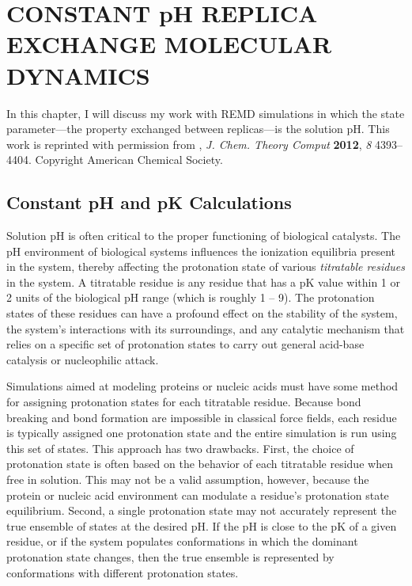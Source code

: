 \chapter{CONSTANT pH REPLICA EXCHANGE MOLECULAR DYNAMICS}
\label{ch3}

In this chapter, I will discuss my work with REMD simulations in which the state
parameter---the property exchanged between replicas---is the solution pH.  This
work is reprinted with permission from
\citeauthor*{Swails_JChemTheoryComput_2012_v8_p4393}, \emph{J. Chem. Theory
Comput} \textbf{2012}, \emph{8} 4393--4404. Copyright
\citeyear{Swails_JChemTheoryComput_2012_v8_p4393} American Chemical Society.
\cite{Swails_JChemTheoryComput_2012_v8_p4393}

\section{Constant pH and pK Calculations}

Solution pH is often critical to the proper functioning of biological catalysts.
\cite{Cornish-Bowden1969,White1959} The pH environment of biological systems
influences the ionization equilibria present in the system, thereby affecting
the protonation state of various \emph{titratable residues} in the system. A
titratable residue is any residue that has a pK value within 1 or 2 units
of the biological pH range (which is roughly 1 -- 9). The protonation states of
these residues can have a profound effect on the stability of the system, the
system's interactions with its surroundings, and any catalytic mechanism that
relies on a specific set of protonation states to carry out general acid-base
catalysis or nucleophilic attack. \cite{Tanford_JAmChemSoc_1957_v79_p5333}

Simulations aimed at modeling proteins or nucleic acids must have some method
for assigning protonation states for each titratable residue. Because bond
breaking and bond formation are impossible in classical force fields, each
residue is typically assigned one protonation state and the entire simulation is
run using this set of states. This approach has two drawbacks. First, the
choice of protonation state is often based on the behavior of each titratable
residue when free in solution. This may not be a valid assumption, however,
because the protein or nucleic acid environment can modulate a residue's
protonation state equilibrium. Second, a single protonation state may not
accurately represent the true ensemble of states at the desired pH. If the pH
is close to the pK of a given residue, or if the system populates
conformations in which the dominant protonation state changes, then the true
ensemble is represented by conformations with different protonation states.

